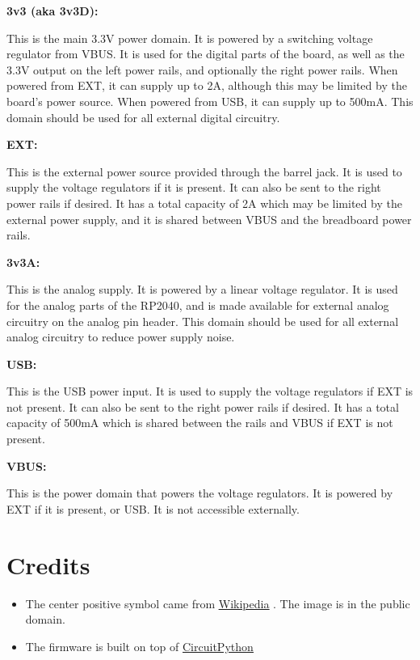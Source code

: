 \documentclass[12pt,letterpaper]{article}
\let\oldhref\href
\renewcommand{\href}[2]{
    {\color{blue}\underline{\oldhref{#1}{#2}}}
}
\newcommand{\bolditem}[1]{
    \par
    \vspace{0.5em}
    \noindent\textbf{#1: }
}
\begin{document}
\bolditem{3v3 (aka 3v3D)}
This is the main 3.3V power domain. It is powered by a switching voltage regulator from VBUS. It is used for the digital parts of the board, as well as the 3.3V output on the left power rails, and optionally the right power rails. When powered from EXT, it can supply up to 2A, although this may be limited by the board's power source. When powered from USB, it can supply up to 500mA. This domain should be used for all external digital circuitry.

\bolditem{EXT}
This is the external power source provided through the barrel jack. It is used to supply the voltage regulators if it is present. It can also be sent to the right power rails if desired. It has a total capacity of 2A which may be limited by the external power supply, and it is shared between VBUS and the breadboard power rails.

\bolditem{3v3A}
This is the analog supply. It is powered by a linear voltage regulator. It is used for the analog parts of the RP2040, and is made available for external analog circuitry on the analog pin header. This domain should be used for all external analog circuitry to reduce power supply noise.

\bolditem{USB}
This is the USB power input. It is used to supply the voltage regulators if EXT is not present. It can also be sent to the right power rails if desired. It has a total capacity of 500mA which is shared between the rails and VBUS if EXT is not present.

\bolditem{VBUS}
This is the power domain that powers the voltage regulators. It is powered by EXT if it is present, or USB. It is not accessible externally.

\section{Credits}
\begin{itemize}
    \item The center positive symbol came from \href{https://en.m.wikipedia.org/wiki/File:Polarity_marking_center_positive.svg}{Wikipedia}. The image is in the public domain.
    \item The firmware is built on top of \href{https://circuitpython.org/}{CircuitPython}
\end{itemize}
\end{document}
